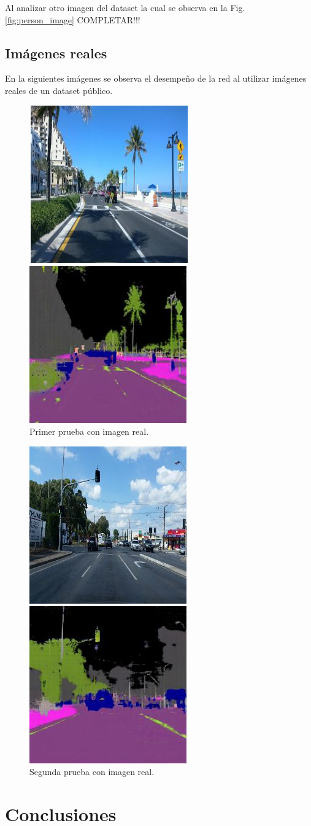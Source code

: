 \documentclass[]{IEEEtran}
\begin{document}
    Al analizar otro imagen del dataset la cual se observa en la Fig.\ref{fig:person_image}
    {COMPLETAR!!!}

    \subsection{Imágenes reales}
    En la siguientes imágenes se observa el desempeño de la red al utilizar imágenes reales de un dataset público. 
    \begin{figure}[htb]
        \centering
        \includegraphics[width=.25\textwidth]{Imgs/PalmeraRGBSEM.png}    
        \caption{Primer prueba con imagen real.}
        \label{fig:real-results}
    \end{figure}
    \begin{figure}[htb]
        \centering
        \includegraphics[width=.25\textwidth]{Imgs/SemaforoRGBSEM.png}    
        \caption{Segunda prueba con imagen real.}
        \label{fig:real-results2}
    \end{figure}

    \section{Conclusiones}
    
\end{document}
